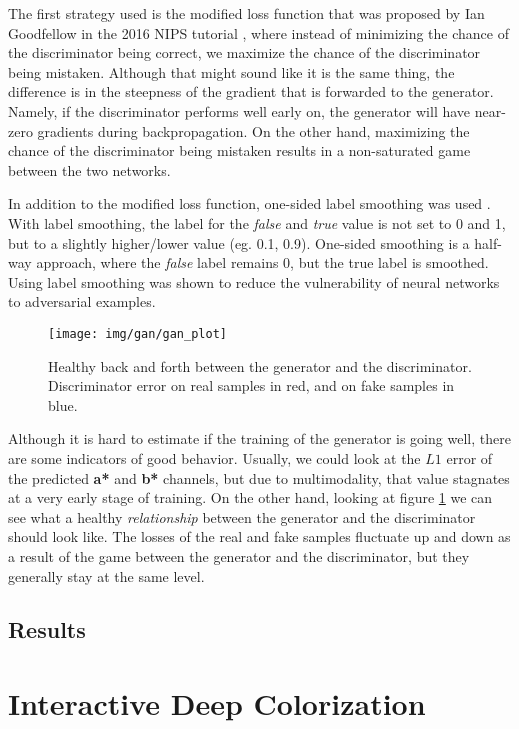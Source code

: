The first strategy used is the modified loss function that was proposed by Ian Goodfellow
in the 2016 NIPS tutorial \citep{goodfellow2017nips}, where instead of minimizing 
the chance of the discriminator being correct, we maximize the chance of the discriminator 
being mistaken. Although that might sound like it is the same thing, the difference 
is in the steepness of the gradient that is forwarded to the generator. Namely, if the 
discriminator performs well early on, the generator will have near-zero gradients
during backpropagation. On the other hand, maximizing the chance of the discriminator
being mistaken results in a non-saturated game between the two networks.

In addition to the modified loss function, one-sided label smoothing was used 
\citep{salimans2016improved_gans}. With label smoothing, the label for the \textit{false} and 
\textit{true} value is not set to 0 and 1, but to a slightly higher/lower value (eg. 0.1, 0.9). 
One-sided smoothing is a half-way approach, where the \textit{false} label remains 0, but the 
true label is smoothed. Using label smoothing was shown to reduce the vulnerability of 
neural networks to adversarial examples.

\begin{figure}[!ht]
	\centering
	\texttt{[image: img/gan/gan\_plot]}
    \caption{Healthy back and forth between the generator and the discriminator. 
	Discriminator error on real samples in red, and on fake samples in blue.}
	\label{fig:gan_plot}
\end{figure}

Although it is hard to estimate if the training of the generator is going well, there 
are some indicators of good behavior. Usually, we could look at the $L1$ error of 
the predicted \textbf{a*} and \textbf{b*} channels, but due to multimodality, that 
value stagnates at a very early stage of training. On the other hand, looking at 
figure \ref{fig:gan_plot} we can see what a healthy \textit{relationship} between
the generator and the discriminator should look like. The losses of the real and fake 
samples fluctuate up and down as a result of the game between the generator and 
the discriminator, but they generally stay at the same level.

\subsection{Results}

\section{Interactive Deep Colorization}
\label{sec:ideep}


